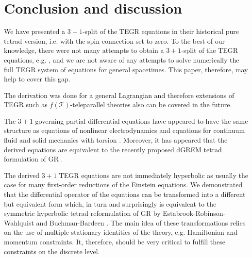 \documentclass[
10pt, %
a4paper, %
oneside, %
twocolumn,
headinclude,footinclude, %
BCOR5mm, %
]{scrartcl}
\newcommand{\Tscal}{\mathcal{T}}		%
\begin{document}
	
	
	\section{Conclusion and discussion}
	
	We have presented a $ 3+1 $-split of the TEGR equations in their historical pure tetrad 
	version, 
	i.e. with the spin connection set to zero. To the best of our 
	knowledge, there were not many attempts 
	to obtain a $ 3+1 $-split of the TEGR equations, e.g. 
	\cite{Capozziello2021,Pati2022}, and we are not aware of any attempts 
	to solve numerically the 
	full TEGR system of equations for general spacetimes. This paper, therefore, may help to cover 
	this 
	gap.
	
	The derivation was done for a general Lagrangian and therefore extensions of TEGR such as $ 
	f(\Tscal) $-teleparallel theories also can be covered in the future. 
	
	The $ 3+1 $ governing partial differential equations have appeared to have the same structure 
	as 
	equations of nonlinear electrodynamics \cite{DPRZ2017} and equations for continuum fluid and 
	solid 
	mechanics with torsion \cite{Torsion2019}. Moreover, it has appeared that the derived equations 
	are 
	equivalent to the recently proposed dGREM tetrad formulation of GR \cite{Olivares2022}. 
	
	The derived $ 3+1 $ TEGR equations are not immediately hyperbolic as usually the case for many 
	first-order reductions of the Einstein equations. We demonstrated that the differential 
	operator of 
	the equations can be transformed into a different but equivalent form which, in turn and 
	surprisingly is equivalent to the symmetric hyperbolic tetrad reformulation of GR by 
	Estabrook-Robinson-Wahlquist \cite{Estabrook1997} and Buchman-Bardeen \cite{Buchman2003}. The 
	main 
	idea of these transformations relies on the use of multiple stationary identities of the 
	theory, 
	e.g. Hamiltonian and momentum constraints. It, therefore, should be very critical to fulfill 
	these 
	constraints on the discrete level.
	
	
\end{document}
